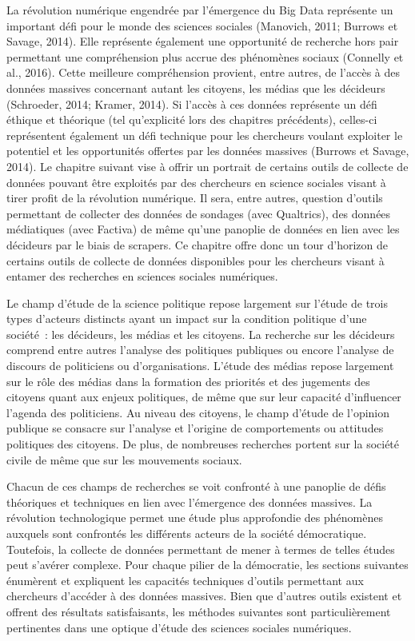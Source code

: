 \documentclass[
  letterpaper,
]{scrbook}
\begin{document}
La révolution numérique engendrée par l'émergence du Big Data représente
un important défi pour le monde des sciences sociales (Manovich, 2011;
Burrows et Savage, 2014). Elle représente également une opportunité de
recherche hors pair permettant une compréhension plus accrue des
phénomènes sociaux (Connelly et al., 2016). Cette meilleure
compréhension provient, entre autres, de l'accès à des données massives
concernant autant les citoyens, les médias que les décideurs (Schroeder,
2014; Kramer, 2014). Si l'accès à ces données représente un défi éthique
et théorique (tel qu'explicité lors des chapitres précédents), celles-ci
représentent également un défi technique pour les chercheurs voulant
exploiter le potentiel et les opportunités offertes par les données
massives (Burrows et Savage, 2014). Le chapitre suivant vise à offrir un
portrait de certains outils de collecte de données pouvant être
exploités par des chercheurs en science sociales visant à tirer profit
de la révolution numérique. Il sera, entre autres, question d'outils
permettant de collecter des données de sondages (avec Qualtrics), des
données médiatiques (avec Factiva) de même qu'une panoplie de données en
lien avec les décideurs par le biais de scrapers. Ce chapitre offre donc
un tour d'horizon de certains outils de collecte de données disponibles
pour les chercheurs visant à entamer des recherches en sciences sociales
numériques.

Le champ d'étude de la science politique repose largement sur l'étude de
trois types d'acteurs distincts ayant un impact sur la condition
politique d'une société~: les décideurs, les médias et les citoyens. La
recherche sur les décideurs comprend entre autres l'analyse des
politiques publiques ou encore l'analyse de discours de politiciens ou
d'organisations. L'étude des médias repose largement sur le rôle des
médias dans la formation des priorités et des jugements des citoyens
quant aux enjeux politiques, de même que sur leur capacité d'influencer
l'agenda des politiciens. Au niveau des citoyens, le champ d'étude de
l'opinion publique se consacre sur l'analyse et l'origine de
comportements ou attitudes politiques des citoyens. De plus, de
nombreuses recherches portent sur la société civile de même que sur les
mouvements sociaux.

Chacun de ces champs de recherches se voit confronté à une panoplie de
défis théoriques et techniques en lien avec l'émergence des données
massives. La révolution technologique permet une étude plus approfondie
des phénomènes auxquels sont confrontés les différents acteurs de la
société démocratique. Toutefois, la collecte de données permettant de
mener à termes de telles études peut s'avérer complexe. Pour chaque
pilier de la démocratie, les sections suivantes énumèrent et expliquent
les capacités techniques d'outils permettant aux chercheurs d'accéder à
des données massives. Bien que d'autres outils existent et offrent des
résultats satisfaisants, les méthodes suivantes sont particulièrement
pertinentes dans une optique d'étude des sciences sociales numériques.
\end{document}
